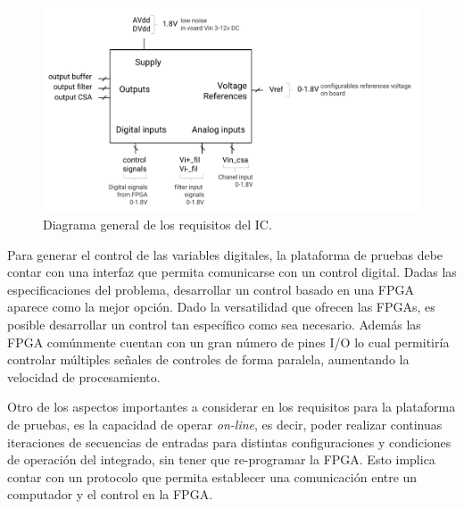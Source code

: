 \begin{figure}[!t]
	\centering
	\includegraphics[width=5in]{./figures/especificiaciones-01}
	\caption{Diagrama general de los requisitos del IC.}\label{fig:thebean_spec}
\end{figure}



Para generar el control de las variables digitales, la plataforma de pruebas debe contar con una interfaz que permita comunicarse con un control digital. Dadas las especificaciones del problema, desarrollar un control basado en una FPGA aparece como la mejor opción. Dado la versatilidad que ofrecen las FPGAs, es posible desarrollar un control tan específico como sea necesario. Además las FPGA comúnmente cuentan con un gran número de pines I/O lo cual permitiría controlar múltiples señales de controles de forma paralela, aumentando la velocidad de procesamiento.

Otro de los aspectos importantes a considerar en los requisitos para la plataforma de pruebas, es la capacidad de operar \textit{on-line}, es decir, poder realizar continuas iteraciones de secuencias de entradas para distintas configuraciones y condiciones de operación del integrado, sin tener que re-programar la FPGA. Esto implica contar con un protocolo que permita establecer una comunicación entre un computador y el control en la FPGA.

